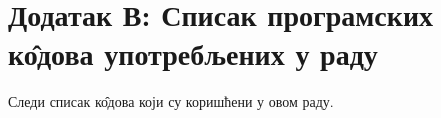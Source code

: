 \section{Додатак В: Списак програмских к\^{о}дова употребљених у раду}
		Следи списак к\^{о}дова који су коришћени у овом раду.
		\lstlistoflistings
